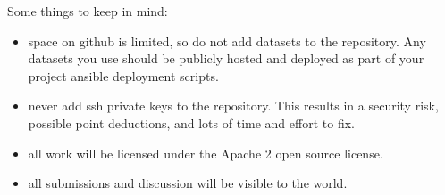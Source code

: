 Some things to keep in mind:
\begin{itemize}
\item {} 
space on github is limited, so do not add datasets to the
repository. Any datasets you use should be publicly hosted and
deployed as part of your project ansible deployment scripts.

\item {} 
never add ssh private keys to the repository. This results in a
security risk, possible point deductions, and lots of time and
effort to fix.

\item {} 
all work will be licensed under the Apache 2 open source license.

\item {} 
all submissions and discussion will be visible to the world.

\end{itemize}


